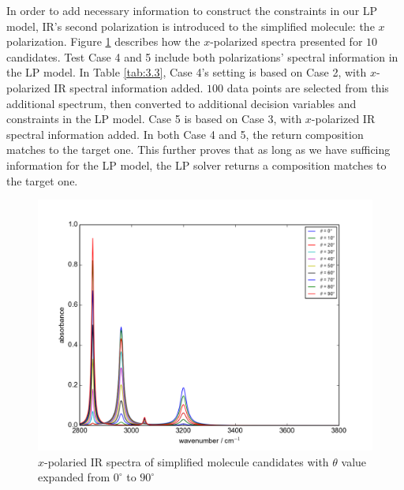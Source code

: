 In order to add necessary information to construct the constraints in our LP model, IR's second polarization is introduced to the simplified molecule: the $x$ polarization. Figure \ref{fig:3.4} describes how the $x$-polarized spectra presented for $10$ candidates. Test Case 4 and 5 include both polarizations' spectral information in the LP model. In Table \ref{tab:3.3}, Case 4's setting is based on Case 2, with $x$-polarized IR spectral information added. $100$ data points are selected from this additional spectrum, then converted to additional decision variables and constraints in the LP model. Case 5 is based on Case 3, with $x$-polarized IR spectral information added. In both Case 4 and 5, the return composition matches to the target one. This further proves that as long as we have sufficing information for the LP model, the LP solver returns a composition matches to the target one. \\ 

\begin{figure}[!ht]
\centering
\includegraphics[scale=0.7]{Figures/Toy_Model_IR_Sine_Projection.png} 
\caption{$x$-polaried IR spectra of simplified molecule candidates with $\theta$ value expanded from $0^{\circ}$ to $90^{\circ}$}  \label{fig:3.4}
\end{figure}


